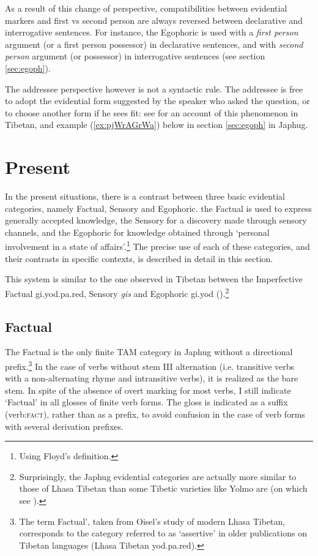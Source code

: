 \documentclass[oldfontcommands,oneside,a4paper,11pt]{article}
\newcommand{\ipa}[1]{{\phon \mbox{#1}}} %
\newcommand{\refb}[1]{(\ref{#1})}
\newcommand{\factual}[1]{\textsc{:fact}}
\begin{document}
As a result of this change of perspective, compatibilities between evidential markers and first vs second person are always reversed between declarative and interrogative sentences. For instance, the Egophoric is used with a \textit{first person} argument (or a first person possessor) in declarative sentences, and with \textit{second person} argument (or possessor) in interrogative sentences (see section \ref{sec:egoph}).

The addressee perspective however is not a syntactic rule. The addressee is free to adopt the evidential form suggested by the speaker who asked the question, or to choose another form if he sees fit: see \citealt{garrett07symbiosis} for an account of this phenomenon in Tibetan, and example
\refb{ex:pjWrAGrWa} below in section \ref{sec:egoph} in Japhug.

\section{Present} \label{sec:evd:prs}
In the present situations, there is a contrast between three basic evidential categories, namely Factual, Sensory and Egophoric. the Factual is used to express generally accepted knowledge, the Sensory for a discovery made through sensory channels, and the Egophoric for knowledge obtained through `personal involvement in a state of affairs'.\footnote{Using Floyd's \citeyearpar{floyd16egophoricity} definition.} The precise use of each of these categories, and their contrasts in specific contexts, is described in detail in this section.

This system is similar to the one observed in Tibetan between the Imperfective Factual \ipa{gi.yod.pa.red}, Sensory \textit{gis} and Egophoric \ipa{gi.yod} (\citealt[295+]{tournadre08conjunct}).\footnote{Surprisingly, the Japhug evidential categories are actually more similar to those of Lhasa Tibetan than some Tibetic varieties like Yolmo are (on which see \citealt{gawne13copulas}).} 



\subsection{Factual} \label{sec:fact}

The Factual is the only finite TAM category in Japhug without a directional prefix.\footnote{The term Factual', taken from Oisel's \citeyear{oisel13aux} study of modern Lhasa Tibetan, corresponds to the category referred to as `assertive' in older publications on Tibetan languages (Lhasa Tibetan \ipa{yod.pa.red}).} In the case of verbs without stem III alternation (i.e. transitive verbs with a non-alternating rhyme and intransitive verbs), it is realized as the bare stem. In spite of the absence of overt marking for most verbs, I still indicate `Factual' in all glosses of finite verb forms. The gloss is indicated as a suffix (verb\factual{}), rather than as a prefix, to avoid confusion in the case of verb forms with several derivation prefixes.
\end{document}
